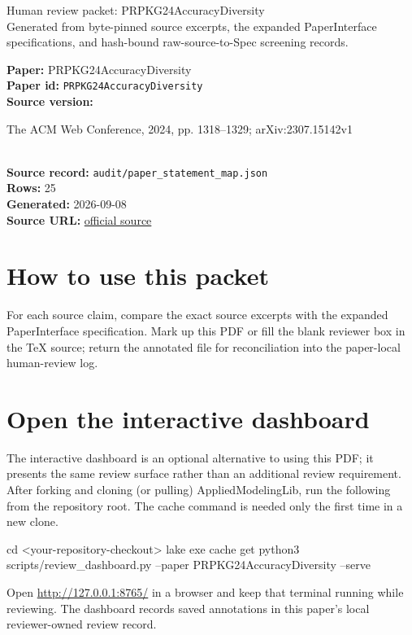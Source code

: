 \documentclass[10pt]{article}
\begin{document}
\fontsize{9}{10}\selectfont

\begin{center}
{\LARGE Human review packet: PRPKG24AccuracyDiversity}\\[0.35em]
\small Generated from byte-pinned source excerpts, the expanded PaperInterface
specifications, and hash-bound raw-source-to-Spec screening records.
\end{center}

\noindent\textbf{Paper:} PRPKG24AccuracyDiversity\\
\textbf{Paper id:} \texttt{PRPKG24AccuracyDiversity}\\
\textbf{Source version:} \parbox[t]{0.76\linewidth}{\raggedright The ACM Web Conference, 2024, pp. 1318--1329; arXiv:2307.15142v1}\\
\textbf{Source record:} \texttt{audit/paper\_statement\_map.json}\\
\textbf{Rows:} 25\\
\textbf{Generated:} 2026-09-08\\
\textbf{Source URL:} \href{https://arxiv.org/pdf/2307.15142}{official source}





\section*{How to use this packet}
For each source claim, compare the exact source excerpts with the expanded
PaperInterface specification. Mark up this PDF or fill the blank reviewer box in the TeX source;
return the annotated file for reconciliation into the paper-local human-review
log.

\section*{Open the interactive dashboard}
The interactive dashboard is an optional alternative to using this PDF; it
presents the same review surface rather than an additional review requirement.
After forking and cloning (or pulling) AppliedModelingLib, run the following from the
repository root. The cache command is needed only the first time in a new clone.
\begin{ReviewVerbatim}
cd <your-repository-checkout>
lake exe cache get
python3 scripts/review_dashboard.py --paper PRPKG24AccuracyDiversity --serve
\end{ReviewVerbatim}
Open \url{http://127.0.0.1:8765/} in a browser and keep that terminal running
while reviewing. The dashboard records saved annotations in this paper's local
reviewer-owned review record.
\end{document}
